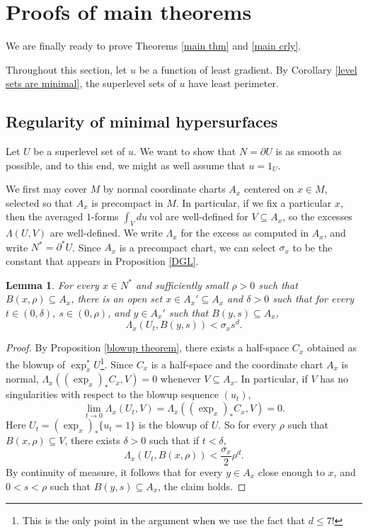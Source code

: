 \documentclass[reqno,12pt,letterpaper]{amsart}
\newcommand{\vol}{\mathrm{vol}}
\newtheorem{lemma}[theorem]{Lemma}
\theoremstyle{definition}
\numberwithin{equation}{section}
\begin{document}

\section{Proofs of main theorems}\label{proof of main thm}
We are finally ready to prove Theorems \ref{main thm} and \ref{main crly}.

Throughout this section, let $u$ be a function of least gradient.
By Corollary \ref{level sets are minimal}, the superlevel sets of $u$ have least perimeter.

\subsection{Regularity of minimal hypersurfaces}
Let $U$ be a superlevel set of $u$.
We want to show that $N = \partial U$ is as smooth as possible, and to this end, we might as well assume that $u = 1_U$.

We first may cover $M$ by normal coordinate charts $A_x$ centered on $x \in M$, selected so that $A_x$ is precompact in $M$.
In particular, if we fix a particular $x$, then the averaged $1$-forms $\int_V du ~\vol$ are well-defined for $V \subseteq A_x$, so the excesses $\Lambda(U, V)$ are well-defined.
We write $\Lambda_x$ for the excess as computed in $A_x$, and write $N^* = \partial^* U$.
Since $A_x$ is a precompact chart, we can select $\sigma_x$ to be the constant that appears in Proposition \ref{DGL}.

\begin{lemma}
For every $x \in N^*$ and sufficiently small $\rho > 0$ such that $B(x, \rho) \subseteq A_x$, there is an open set $x \in A_x' \subseteq A_x$ and $\delta > 0$ such that for every $t \in (0, \delta)$, $s \in (0, \rho)$, and $y \in A_x'$ such that $B(y, s) \subseteq A_x$,
\begin{equation}\label{basecase}\Lambda_x(U_t, B(y, s)) < \sigma_x s^d.\end{equation}
\end{lemma}
\begin{proof}
By Proposition \ref{blowup theorem}, there exists a half-space $C_x$ obtained as the blowup of $\exp_x^* U$\footnote{This is the only point in the argument when we use the fact that $d \leq 7$!}.
Since $C_x$ is a half-space and the coordinate chart $A_x$ is normal, $\Lambda_x((\exp_x)_* C_x, V) = 0$ whenever $V \subseteq A_x$.
In particular, if $V$ has no singularities with respect to the blowup sequence $(u_t)$,
$$\lim_{t \to 0} \Lambda_x(U_t, V) = \Lambda_x((\exp_x)_* C_x, V) = 0.$$
Here $U_t = (\exp_x)_* \{u_t = 1\}$ is the blowup of $U$.
So for every $\rho$ such that $B(x, \rho) \subseteq V$, there exists $\delta > 0$ such that if $t < \delta$,
$$\Lambda_x(U_t, B(x, \rho)) < \frac{\sigma_x}{2} \rho^d.$$
By continuity of measure, it follows that for every $y \in A_x$ close enough to $x$, and $0 < s < \rho$ such that $B(y, s) \subseteq A_x$, the claim holds.
\end{proof}
\end{document}
